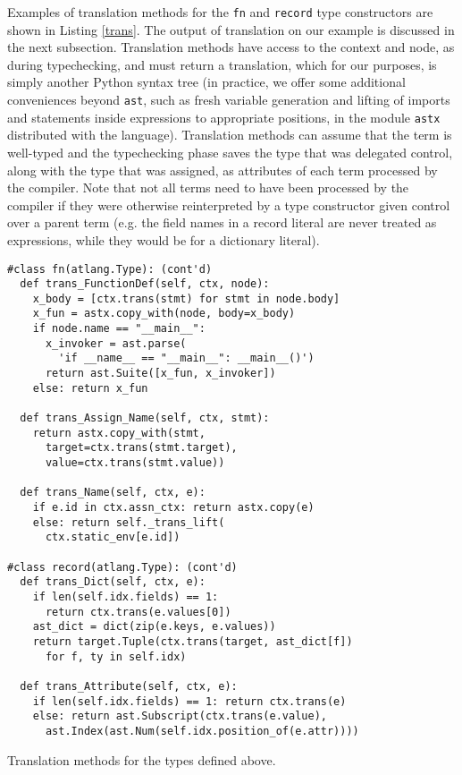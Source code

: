 \documentclass[9pt,preprint]{sigplanconf}
\newcommand{\lstinlinep}[1]{\lstinline[language=Python,basicstyle=\ttfamily\small]{#1}}
\begin{document}
Examples of translation methods for the \lstinlinep{fn} and \lstinlinep{record} type constructors are shown in Listing \ref{trans}. The output of translation on our example is discussed in the next subsection. Translation methods have access to the context and node, as during typechecking, and must return a translation, which for our purposes, is simply another Python syntax tree (in practice, we offer some additional conveniences beyond \lstinlinep{ast}, such as fresh variable generation and lifting of imports and statements inside expressions to appropriate positions, in the module \lstinlinep{astx} distributed with the language). Translation methods can assume that the term is well-typed and the typechecking phase saves the type that was delegated control, along with the type that was assigned, as attributes of each term processed by the compiler. Note that not all terms need to have been processed by the compiler if they were otherwise reinterpreted by a type constructor given control over a parent term (e.g. the field names in a record literal are never treated as expressions, while they would be for a dictionary literal). %
\begin{codelisting}[t]
\begin{lstlisting}
#class fn(atlang.Type): (cont'd)
  def trans_FunctionDef(self, ctx, node):
    x_body = [ctx.trans(stmt) for stmt in node.body]
    x_fun = astx.copy_with(node, body=x_body)
    if node.name == "__main__": 
      x_invoker = ast.parse(
        'if __name__ == "__main__": __main__()')
      return ast.Suite([x_fun, x_invoker])
    else: return x_fun
  
  def trans_Assign_Name(self, ctx, stmt):
    return astx.copy_with(stmt, 
      target=ctx.trans(stmt.target), 
      value=ctx.trans(stmt.value))
    
  def trans_Name(self, ctx, e):
    if e.id in ctx.assn_ctx: return astx.copy(e)
    else: return self._trans_lift(
      ctx.static_env[e.id])
    
#class record(atlang.Type): (cont'd)
  def trans_Dict(self, ctx, e): 
    if len(self.idx.fields) == 1: 
      return ctx.trans(e.values[0])
    ast_dict = dict(zip(e.keys, e.values))
    return target.Tuple(ctx.trans(target, ast_dict[f])
      for f, ty in self.idx)

  def trans_Attribute(self, ctx, e):
    if len(self.idx.fields) == 1: return ctx.trans(e)
    else: return ast.Subscript(ctx.trans(e.value), 
      ast.Index(ast.Num(self.idx.position_of(e.attr))))
\end{lstlisting}
\caption{Translation methods for the types defined above.}
\label{trans}
\end{codelisting}
\end{document}
